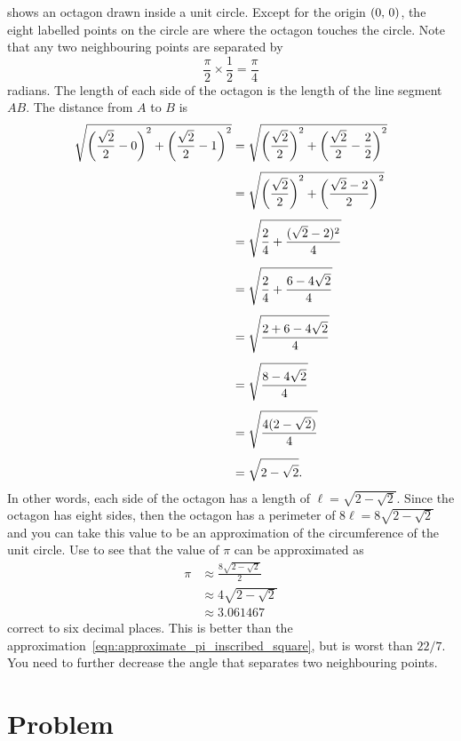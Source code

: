 \documentclass[a4paper,oneside,12pt]{article}
\begin{document}
 shows an octagon drawn inside a
unit circle.  Except for the origin $\tuple{0}{0}$, the eight labelled
points on the circle are where the octagon touches the circle.  Note
that any two neighbouring points are separated by
\[
\frac{\pi}{2} \times \frac{1}{2}
=
\frac{\pi}{4}
\]
radians.  The length of each side of the octagon is the length of the
line segment $AB$.  The distance from $A$ to $B$ is
\begin{align*}
\sqrt{
  \parenthesis*{\frac{\sqrt{2}}{2} - 0}^2
  +
  \parenthesis*{\frac{\sqrt{2}}{2} - 1}^2
}
&=
\sqrt{
  \parenthesis*{\frac{\sqrt{2}}{2}}^2
  +
  \parenthesis*{\frac{\sqrt{2}}{2} - \frac{2}{2}}^2
} \\[4pt]
&=
\sqrt{
  \parenthesis*{\frac{\sqrt{2}}{2}}^2
  +
  \parenthesis*{\frac{\sqrt{2} - 2}{2}}^2
} \\[4pt]
&=
\sqrt{
  \frac{2}{4}
  +
  \frac{(\sqrt{2} - 2)^2}{4}
} \\[4pt]
&=
\sqrt{
  \frac{2}{4}
  +
  \frac{6 - 4\sqrt{2}}{4}
} \\[4pt]
&=
\sqrt{
  \frac{
    2 + 6 - 4\sqrt{2}
  }{
    4
  }
} \\[4pt]
&=
\sqrt{
  \frac{
    8 - 4\sqrt{2}
  }{
    4
  }
} \\[4pt]
&=
\sqrt{
  \frac{
    4(2 - \sqrt{2})
  }{
    4
  }
} \\[4pt]
&=
\sqrt{
  2 - \sqrt{2}
}.
\end{align*}
In other words, each side of the octagon has a length of
$\ell = \sqrt{2 - \sqrt{2}}$.  Since the octagon has eight sides, then
the octagon has a perimeter of $8\ell = 8\sqrt{2 - \sqrt{2}}$ and you
can take this value to be an approximation of the circumference of the
unit circle.  Use  to see
that the value of $\pi$ can be approximated as
\begin{align*}
\pi
&\approx
\frac{
  8\sqrt{2 - \sqrt{2}}
}{
  2
} \\[4pt]
&\approx
4\sqrt{2 - \sqrt{2}} \\[4pt]
&\approx
3.061467
\end{align*}
correct to six decimal places.  This is better than the
approximation~\eqref{eqn:approximate_pi_inscribed_square}, but is
worst than $22 / 7$.  You need to further decrease the angle that
separates two neighbouring points.



\section*{Problem}
\end{document}
